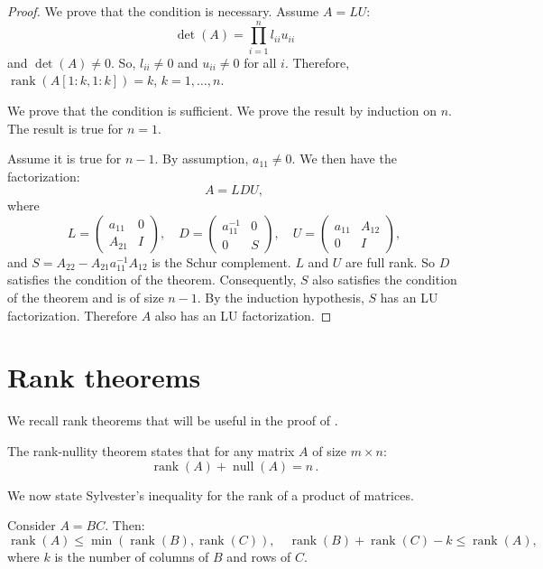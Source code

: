 \documentclass[10pt,twoside]{siamart1116}
\DeclareMathOperator{\rk}{rank}
\DeclareMathOperator{\nl}{null}
\numberwithin{theorem}{section}
\begin{document}
\begin{proof}
  We prove that the condition is necessary. Assume $A = LU$:
  \[ \det(A) = \prod_{i=1}^n l_{ii} u_{ii} \]
  and $\det(A) \neq 0$. So, $l_{ii} \neq 0$ and $u_{ii} \neq 0$ for all $i$. Therefore, $\rk(A[1:k,1:k]) = k$, $k = 1, \ldots, n$.

  We prove that the condition is sufficient. We prove the result by induction on $n$. The result is true for $n=1$.

  Assume it is true for $n-1$. By assumption, $a_{11} \neq 0$. We then have the factorization:
  \[
    A = LDU,
  \]
  where
  \[
    L =
    \begin{pmatrix}
      a_{11} & 0 \\
      A_{21} & I
    \end{pmatrix}, \quad
    D =
    \begin{pmatrix}
      a_{11}^{-1} & 0 \\
      0           & S
    \end{pmatrix}, \quad
    U =
    \begin{pmatrix}
      a_{11} & A_{12} \\
      0      & I
    \end{pmatrix},
  \]
  and $S = A_{22} - A_{21} a_{11}^{-1} A_{12}$ is the Schur complement. $L$ and $U$ are full rank. So $D$ satisfies the condition of the theorem. Consequently, $S$ also satisfies the condition of the theorem and is of size $n-1$. By the induction hypothesis, $S$ has an LU factorization. Therefore $A$ also has an LU factorization.
\end{proof}

\section{Rank theorems} \label{sec:rank}

We recall rank theorems that will be useful in the proof of .

\begin{theorem}\label{thm:rank-nullity}
  The rank-nullity theorem states that for any matrix $A$ of size $m \times n$:
  \[
    \rk(A) + \nl(A) = n \,.
  \]
\end{theorem}

We now state Sylvester's inequality for the rank of a product of matrices.

\begin{lemma}\label{lem:rank}
  Consider $A = BC$. Then:
  \[
    \rk(A) \le \min(\rk(B), \rk(C)), \quad
    \rk(B) + \rk(C) - k \le \rk(A),
  \]
  where $k$ is the number of columns of $B$ and rows of $C$.
\end{lemma}
\end{document}
